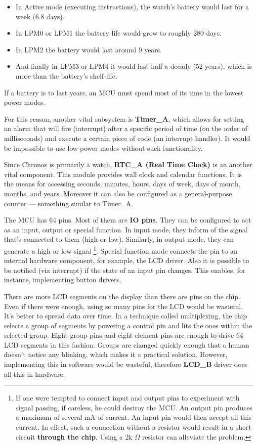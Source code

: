 \begin{itemize}
    \item In Active mode (executing instructions), the watch's battery
      would last for a week (6.8 days).
    \item In LPM0 or LPM1 the battery life would grow to roughly 280 days.
    \item In LPM2 the battery would last around 9 years.
    \item And finally in LPM3 or LPM4 it would last half a decade (52
    years), which is more than the battery's shelf-life.
\end{itemize}
If a battery is to last years, an MCU must spend most of its time in
the lowest power modes.

For this reason, another vital subsystem is {\bf Timer\_A}, which
allows for setting an alarm that will fire (interrupt) after a specific
period of time (on the order of milliseconds) and execute a certain
piece of code (an interrupt handler). It would be impossible to use low
power modes without such functionality.

Since Chronos is primarily a watch, {\bf RTC\_A (Real Time Clock)} is
an another vital component. This module provides wall clock and
calendar functions. It is the means for accessing seconds, minutes,
hours, days of week, days of month, months, and years.  Moreover it
can also be configured as a general-purpose counter --- something
similar to Timer\_A.

The MCU has 64 pins. Most of them are {\bf IO pins}. They can be
configured to act as an input, output or special function.  In input
mode, they inform of the signal that's connected to them (high or
low). Similarly, in output mode, they can generate a high or low
signal \footnote{If one were tempted to connect input and output pins
to experiment with signal passing, if careless, he could destroy the
MCU.  An output pin produces a maximum of several mA of current. An
input pin would then accept all this current. In effect, such a
connection without a resistor would result in a short circuit {\bf
through the chip}. Using a 2k $\Omega$ resistor can alleviate the
problem.}. Special function mode connects the pin to an internal
hardware component, for example, the LCD driver.  Also it is possible
to be notified (via interrupt) if the state of an input pin changes.
This enables, for instance, implementing button drivers.

There are more LCD segments on the display than there are pins on the
chip. Even if there were enough, using so many pins for the LCD would
be wasteful. It's better to spread data over time. In a technique
called multiplexing, the chip selects a group of segments by powering
a control pin and lits the ones within the selected group. Eight group
pins and eight element pins are enough to drive 64 LCD segments in
this fashion. Groups are changed quickly enough that a human doesn't
notice any blinking, which makes it a practical solution.  However,
implementing this in software would be wasteful, therefore {\bf
LCD\_B} driver does all this in hardware.

